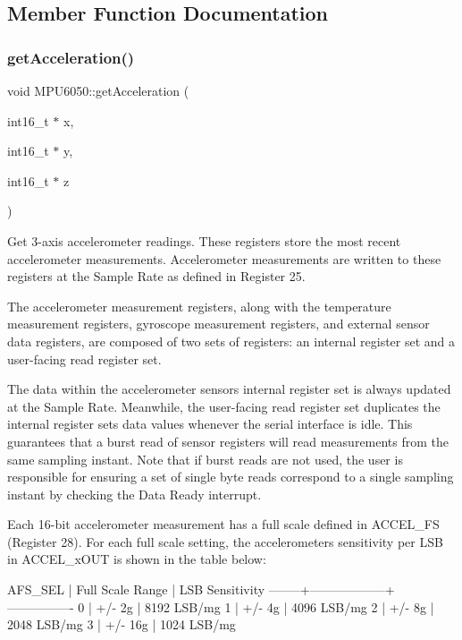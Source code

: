 \subsection{Member Function Documentation}
\mbox{\label{class_m_p_u6050_a658dfc7e35b7fdba360a75f137bde33a}} 
\subsubsection{\texorpdfstring{getAcceleration()}{getAcceleration()}}
{\footnotesize\ttfamily void M\+P\+U6050\+::get\+Acceleration (\begin{DoxyParamCaption}\item[{int16\+\_\+t $\ast$}]{x,  }\item[{int16\+\_\+t $\ast$}]{y,  }\item[{int16\+\_\+t $\ast$}]{z }\end{DoxyParamCaption})}

Get 3-\/axis accelerometer readings. These registers store the most recent accelerometer measurements. Accelerometer measurements are written to these registers at the Sample Rate as defined in Register 25.

The accelerometer measurement registers, along with the temperature measurement registers, gyroscope measurement registers, and external sensor data registers, are composed of two sets of registers\+: an internal register set and a user-\/facing read register set.

The data within the accelerometer sensors\textquotesingle{} internal register set is always updated at the Sample Rate. Meanwhile, the user-\/facing read register set duplicates the internal register set\textquotesingle{}s data values whenever the serial interface is idle. This guarantees that a burst read of sensor registers will read measurements from the same sampling instant. Note that if burst reads are not used, the user is responsible for ensuring a set of single byte reads correspond to a single sampling instant by checking the Data Ready interrupt.

Each 16-\/bit accelerometer measurement has a full scale defined in A\+C\+C\+E\+L\+\_\+\+FS (Register 28). For each full scale setting, the accelerometers\textquotesingle{} sensitivity per L\+SB in A\+C\+C\+E\+L\+\_\+x\+O\+UT is shown in the table below\+:


\begin{DoxyPre}
AFS\_SEL | Full Scale Range | LSB Sensitivity
--------+------------------+----------------
0       | +/- 2g           | 8192 LSB/mg
1       | +/- 4g           | 4096 LSB/mg
2       | +/- 8g           | 2048 LSB/mg
3       | +/- 16g          | 1024 LSB/mg
\end{DoxyPre}



